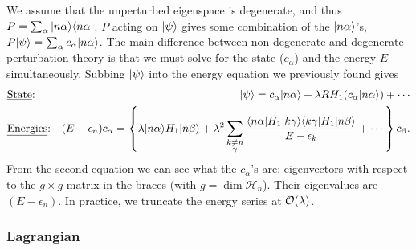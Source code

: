 \documentclass[11pt]{article}
\begin{document}
\begin{eexample}
    We assume that the unperturbed eigenspace is degenerate,
    and thus $P = \sum_\alpha | n\alpha \rangle \langle n\alpha |$.
    $P$ acting on $\lvert\psi\rangle$ gives some combination of
    the $\lvert n\alpha\rangle$'s, $P\lvert\psi\rangle = \sum_\alpha c_\alpha \lvert n\alpha\rangle$.
    The main difference between non-degenerate and degenerate
    perturbation theory is that we must solve for the state ($c_\alpha$)
    and the energy $E$ simultaneously. Subbing $\lvert\psi\rangle$ into the energy
    equation we previously found gives
    \begin{align*}
        & \text{\underline{State}:} & \lvert\psi\rangle = c_\alpha \lvert n\alpha\rangle + \lambda R H_1 (c_\alpha \lvert n\alpha\rangle) + \cdots\\
        & \text{\underline{Energies}:} & (E - \epsilon_n) c_\alpha = \left\{ \lambda \lvert n\alpha\rangle H_1 \lvert n\beta\rangle + \lambda^2 \sum_{\substack{k \neq n \\ \gamma}} \frac{\langle n\alpha\rvert H_1 \lvert k\gamma\rangle \langle k\gamma\rvert H_1 \lvert n\beta\rangle}{E - \epsilon_k} + \cdots \right\} c_\beta.
    \end{align*}
    From the second equation we can see what the $c_\alpha$'s are:
    eigenvectors with respect to the $g \times g$ matrix in the braces
    (with $g = \dim{\mathcal{H}_n}$). Their eigenvalues are $(E - \epsilon_n)$.
    In practice, we truncate the energy series at $\mathcal{O}(\lambda)$.

\end{eexample}

\begin{eexample}
\end{eexample}







\subsubsection{Lagrangian}
\end{document}

